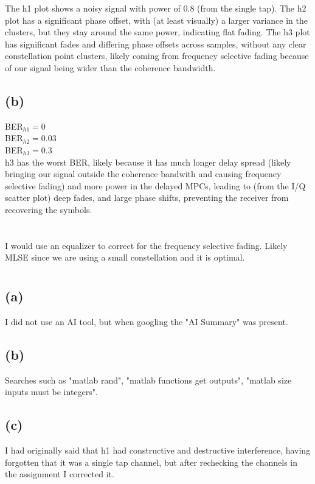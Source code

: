 \documentclass[]{article}
\begin{document}
The h1 plot shows a noisy signal with power of 0.8 (from the single tap). The h2 plot has a significant phase offset, with (at least visually) a larger variance in the clusters, but they stay around the same power, indicating flat fading. The h3 plot has significant fades and differing phase offsets across samples, without any clear constellation point clusters, likely coming from frequency selective fading because of our signal being wider than the coherence bandwidth.

\subsection*{(b)}
BER$_{h1} = 0$\\
BER$_{h2} = 0.03$\\
BER$_{h3} = 0.3$\\

h3 has the worst BER, likely because it has much longer delay spread (likely bringing our signal outside the coherence bandwith and causing frequency selective fading) and more power in the delayed MPCs, leading to (from the I/Q scatter plot) deep fades, and large phase shifts, preventing the receiver from recovering the symbols.

\section{}
I would use an equalizer to correct for the frequency selective fading. Likely MLSE since we are using a small constellation and it is optimal.

\section{}
\subsection*{(a)}
I did not use an AI tool, but when googling the "AI Summary" was present.
\subsection{(b)}
Searches such as "matlab rand", "matlab functions get outputs", "matlab size inputs must be integers".
\subsection{(c)}
I had originally said that h1 had constructive and destructive interference, having forgotten that it was a single tap channel, but after rechecking the channels in the assignment I corrected it.
\end{document}
